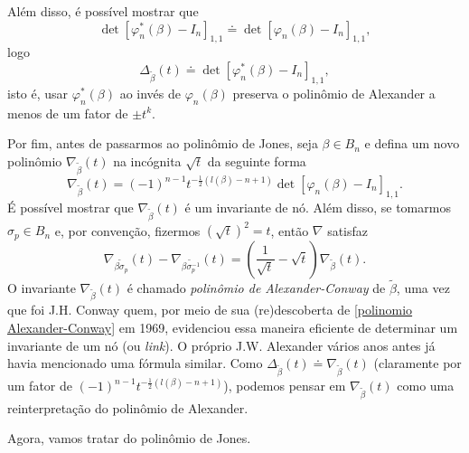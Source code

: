 	\par\vspace{0.3cm} Além disso, é possível mostrar que
	\begin{equation*}
	    \det[\varphi_n^\ast(\beta) - I_n]_{1,1}\doteq\det[\varphi_n(\beta) - I_n]_{1,1},
	\end{equation*}	
	logo
	\begin{equation*}
	    \Delta_{\widetilde{\beta}}(t) \doteq \det[\varphi_n^\ast(\beta) - I_n]_{1,1},
	\end{equation*}
	isto é, usar $\varphi_n^\ast(\beta)$ ao invés de $\varphi_n(\beta)$ preserva o polinômio 
	de Alexander a menos de um fator de $\pm t^k$.
	
	\par\vspace{0.3cm} Por fim, antes de passarmos ao polinômio de Jones, seja $\beta\in B_n$ 
	e defina um novo polinômio $\nabla_{\widetilde{\beta}}(t)$ na incógnita $\sqrt{t}$ da seguinte forma
	\begin{equation*}
	    \nabla_{\widetilde{\beta}}(t)
	    = (-1)^{n-1}t^{-\frac{1}{2}(l(\beta)-n+1)}\det[\varphi_n(\beta) - I_n]_{1,1}.
	\end{equation*}
	É possível mostrar que $\nabla_{\widetilde{\beta}}(t)$ é um invariante de nó. 
	Além disso, se tomarmos $\sigma_p\in B_n$ e, por convenção, fizermos $(\sqrt{t})^2 = t$, 
	então $\nabla$ satisfaz
	\begin{equation}
	\label{polinomio Alexander-Conway}
    	\nabla_{\widetilde{\beta\sigma_p}}(t) - \nabla_{\widetilde{\beta\sigma_p^{-1}}}(t) 
    	= \left(\frac{1}{\sqrt{t}}- \sqrt{t}\right)\nabla_{\widetilde{\beta}}(t).
	\end{equation}
	O invariante $\nabla_{\widetilde{\beta}}(t)$ é chamado \textit{polinômio de Alexander-Conway}
	de $\widetilde{\beta}$, uma vez que foi J.H. Conway quem, por meio de sua (re)descoberta de 
	\eqref{polinomio Alexander-Conway} em 1969, evidenciou essa maneira eficiente de determinar 
	um invariante de um nó (ou \textit{link}). O próprio J.W. Alexander vários anos antes já 
	havia mencionado uma fórmula similar. Como 
	$\Delta_{\widetilde{\beta}}(t)\doteq\nabla_{\widetilde{\beta}}(t)$ (claramente por um 
	fator de $(-1)^{n-1}t^{-\frac{1}{2}(l(\beta)-n+1)}$), podemos pensar em 
	$\nabla_{\widetilde{\beta}}(t)$ como uma reinterpretação do polinômio de Alexander.
	
	\par\vspace{0.3cm} Agora, vamos tratar do polinômio de Jones.
	
